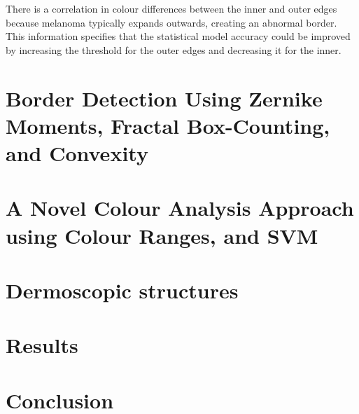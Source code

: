 There is a correlation in colour differences between the inner and outer edges because melanoma typically expands outwards, creating an abnormal border. This information specifies that the statistical model accuracy could be improved by increasing the threshold for the outer edges and decreasing it for the inner.

\section{Border Detection Using Zernike Moments, 
Fractal Box-Counting, and Convexity}

\section{A Novel Colour Analysis Approach using Colour Ranges, and SVM}

\section{Dermoscopic structures}

\section{Results}


\section{Conclusion}





